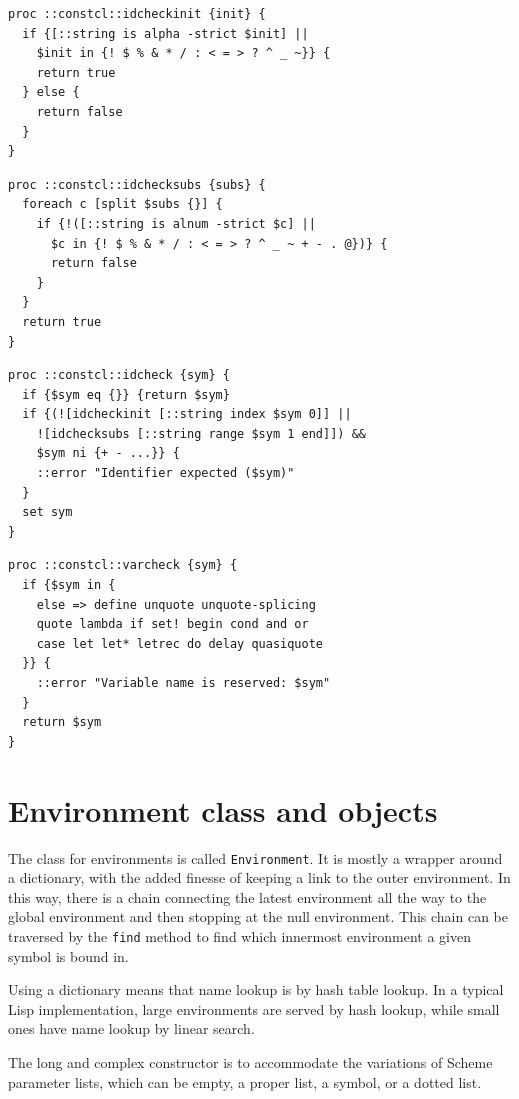 \documentclass[twoside,9pt]{report}
\begin{document}
\begin{lstlisting}
proc ::constcl::idcheckinit {init} {
  if {[::string is alpha -strict $init] ||
    $init in {! $ % & * / : < = > ? ^ _ ~}} {
    return true
  } else {
    return false
  }
}
\end{lstlisting}
\begin{lstlisting}
proc ::constcl::idchecksubs {subs} {
  foreach c [split $subs {}] {
    if {!([::string is alnum -strict $c] ||
      $c in {! $ % & * / : < = > ? ^ _ ~ + - . @})} {
      return false
    }
  }
  return true
}
\end{lstlisting}
\begin{lstlisting}
proc ::constcl::idcheck {sym} {
  if {$sym eq {}} {return $sym}
  if {(![idcheckinit [::string index $sym 0]] ||
    ![idchecksubs [::string range $sym 1 end]]) &&
    $sym ni {+ - ...}} {
    ::error "Identifier expected ($sym)"
  }
  set sym
}
\end{lstlisting}
\begin{lstlisting}
proc ::constcl::varcheck {sym} {
  if {$sym in {
    else => define unquote unquote-splicing
    quote lambda if set! begin cond and or
    case let let* letrec do delay quasiquote
  }} {
    ::error "Variable name is reserved: $sym"
  }
  return $sym
}
\end{lstlisting}
\chapter{Environment class and objects}
\label{environment-class-and-objects}


The class for environments is called \texttt{Environment}. It is mostly a wrapper around a dictionary, with the added finesse of keeping a link to the outer environment. In this way, there is a chain connecting the latest environment all the way to the global environment and then stopping at the null environment. This chain can be traversed by the \texttt{find} method to find which innermost environment a given symbol is bound in.


Using a dictionary means that name lookup is by hash table lookup. In a typical Lisp implementation, large environments are served by hash lookup, while small ones have name lookup by linear search.


The long and complex constructor is to accommodate the variations of Scheme parameter lists, which can be empty, a proper list, a symbol, or a dotted list.
\end{document}

